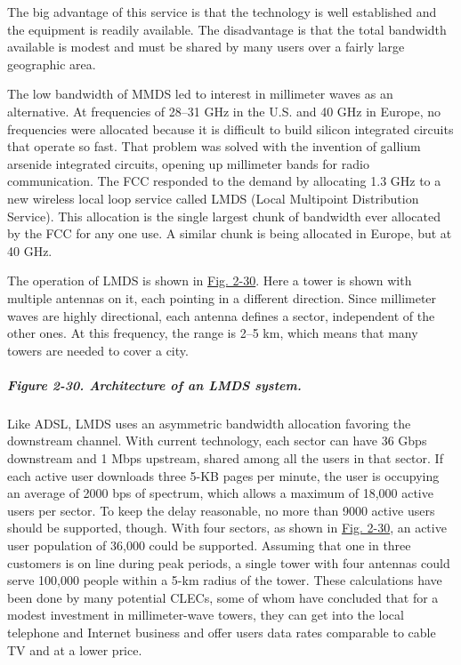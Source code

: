 The big advantage of this service is that the technology is well
established and the equipment is readily available. The disadvantage is
that the total bandwidth available is modest and must be shared by many
users over a fairly large geographic area.

The low bandwidth of MMDS led to interest in millimeter waves as an
alternative. At frequencies of 28--31 GHz in the U.S. and 40 GHz in
Europe, no frequencies were allocated because it is difficult to build
silicon integrated circuits that operate so fast. That problem was
solved with the invention of gallium arsenide integrated circuits,
opening up millimeter bands for radio communication. The FCC responded
to the demand by allocating 1.3 GHz to a new wireless local loop service
called {LMDS} ({Local Multipoint Distribution Service}). This allocation
is the single largest chunk of bandwidth ever allocated by the FCC for
any one use. A similar chunk is being allocated in Europe, but at 40
GHz.

The operation of LMDS is shown in
\protect\hyperlink{0130661023_ch02lev1sec5.htmlux5cux23ch02fig30}{Fig.
2-30}. Here a tower is shown with multiple antennas on it, each pointing
in a different direction. Since millimeter waves are highly directional,
each antenna defines a sector, independent of the other ones. At this
frequency, the range is 2--5 km, which means that many towers are needed
to cover a city.

\subparagraph[Figure 2-30. Architecture of an LMDS
system.]{\texorpdfstring{\protect\hypertarget{0130661023_ch02lev1sec5.htmlux5cux23ch02fig30}{}{}Figure
2-30. Architecture of an LMDS
system.}{Figure 2-30. Architecture of an LMDS system.}}


Like ADSL, LMDS uses an asymmetric bandwidth allocation favoring the
downstream channel. With current technology, each sector can have 36
Gbps downstream and 1 Mbps upstream, shared among all the users in that
sector. If each active user downloads three 5-KB pages per minute, the
user is occupying an average of 2000 bps of spectrum, which allows a
maximum of 18,000 active users per sector. To keep the delay reasonable,
no more than 9000 active users should be supported, though. With four
sectors, as shown in
\protect\hyperlink{0130661023_ch02lev1sec5.htmlux5cux23ch02fig30}{Fig.
2-30}, an active user population of 36,000 could be supported. Assuming
that one in three customers is on line during peak periods, a single
tower with four antennas could serve 100,000 people within a 5-km radius
of the tower. These calculations have been done by many potential CLECs,
some of whom have concluded that for a modest investment in
millimeter-wave towers, they can get into the local telephone and
Internet business and offer users data rates comparable to cable TV and
at a lower price.

